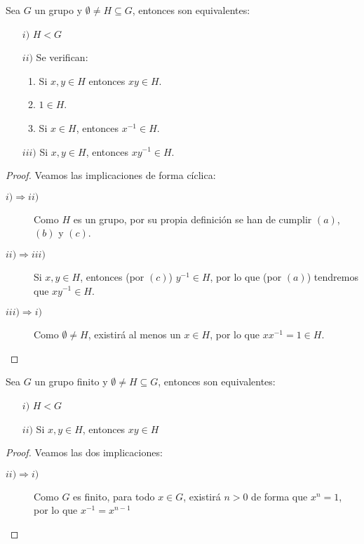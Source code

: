 \begin{prop}
    Sea $G$ un grupo y $\emptyset \neq H \subseteq G$, entonces son equivalentes:
    \begin{enumerate}
        \item[$i)$] $H < G$
        \item[$ii)$] Se verifican:
            \begin{enumerate}[label=(\alph*)]
                \item Si $x,y\in H$ entonces $xy\in H$.
                \item $1\in H$.
                \item Si $x\in H$, entonces $x^{-1}\in H$.
            \end{enumerate}
        \item[$iii)$] Si $x,y\in H$, entonces $xy^{-1}\in H$.
    \end{enumerate}
    \begin{proof}
        Veamos las implicaciones de forma cíclica:
        \begin{description}
            \item [$i)\Longrightarrow ii)$] Como $H$ es un grupo, por su propia definición se han de cumplir $(a)$, $(b)$ y $(c)$.
            \item [$ii)\Longrightarrow iii)$] Si $x,y\in H$, entonces (por $(c)$) $y^{-1}\in H$, por lo que (por $(a)$) tendremos que $xy^{-1}\in H$.
            \item [$iii)\Longrightarrow i)$] Como $\emptyset \neq H$, existirá al menos un $x\in H$, por lo que $xx^{-1} = 1 \in H$. %
        \end{description}
    \end{proof}
\end{prop}

\begin{prop}
    Sea $G$ un grupo finito y $\emptyset \neq H \subseteq G$, entonces son equivalentes:
    \begin{enumerate}
        \item[$i)$] $H < G$
        \item[$ii)$] Si $x,y\in H$, entonces $xy\in H$
    \end{enumerate}
    \begin{proof}
        Veamos las dos implicaciones:
        \begin{description}
            \item [$ii)\Longrightarrow i)$] Como $G$ es finito, para todo $x\in G$, existirá $n>0$ de forma que $x^n = 1$, por lo que $x^{-1} = x^{n-1}$%
            \item [] 
        \end{description}
    \end{proof}
\end{prop}

